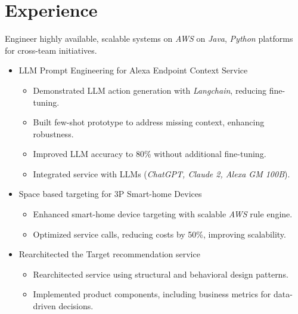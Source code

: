 \section{Experience}
{Engineer highly available, scalable systems on \textit{AWS} on \textit{Java}, \textit{Python} platforms for cross-team initiatives.\newline{}
\begin{itemize}
\setlength\itemsep{1em}
    \item LLM Prompt Engineering for Alexa Endpoint Context Service
        \begin{itemize}
            \item Demonstrated LLM action generation with \textit{Langchain}, reducing fine-tuning.
            \item Built few-shot prototype to address missing context, enhancing robustness.
            \item Improved LLM accuracy to 80\% without additional fine-tuning.
            \item Integrated service with LLMs (\textit{ChatGPT, Claude 2, Alexa GM 100B}).
        \end{itemize}
    \item Space based targeting for 3P Smart-home Devices
    \begin{itemize}
        \item Enhanced smart-home device targeting with scalable \textit{AWS} rule engine.
        \item Optimized service calls, reducing costs by 50\%, improving scalability.
    \end{itemize}
    \item Rearchitected the Target recommendation service
        \begin{itemize}
            \item Rearchitected service using structural and behavioral design patterns.
            \item Implemented product components, including business metrics for data-driven decisions.
        \end{itemize}
\end{itemize}}


